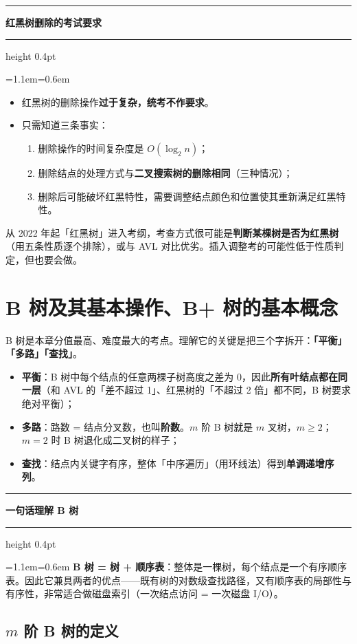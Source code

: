 \documentclass[11pt,openany,UTF8]{ctexbook}
\newcommand{\callouthead}[2]{%
  \par\addvspace{7pt}\noindent
  {\color{#1}\rule[-0.15em]{3pt}{1.05em}}\hspace{0.5em}%
  {\bfseries\color{#1}#2}\par\nobreak\vspace{-0.35em}%
  {\color{rulesep}\hrule height 0.4pt}\nobreak\vspace{0.45em}%
  \begingroup\small\setlength{\parindent}{0pt}%
  \leftskip=1.1em\rightskip=0.6em\noindent\ignorespaces}
\newcommand{\calloutend}{\par\endgroup\addvspace{7pt}}
\newenvironment{callkey}[1]{\callouthead{keybar}{#1}}{\calloutend}
\begin{document}
\begin{callkey}{红黑树删除的考试要求}
\begin{itemize}
\item 红黑树的删除操作\textbf{过于复杂，统考不作要求}。
\item 只需知道三条事实：
\begin{enumerate}
\item 删除操作的时间复杂度是 $O(\log_2 n)$；
\item 删除结点的处理方式与\textbf{二叉搜索树的删除相同}（三种情况）；
\item 删除后可能破坏红黑特性，需要调整结点颜色和位置使其重新满足红黑特性。
\end{enumerate}
\end{itemize}
从 2022 年起「红黑树」进入考纲，考查方式很可能是\textbf{判断某棵树是否为红黑树}（用五条性质逐个排除），或与 AVL 对比优劣。插入调整考的可能性低于性质判定，但也要会做。

\end{callkey}

\section{B 树及其基本操作、B+ 树的基本概念}

B 树是本章分值最高、难度最大的考点。理解它的关键是把三个字拆开：\textbf{「平衡」「多路」「查找」}。

\begin{itemize}
\item \textbf{平衡}：B 树中每个结点的任意两棵子树高度之差为 0，因此\textbf{所有叶结点都在同一层}（和 AVL 的「差不超过 1」、红黑树的「不超过 2 倍」都不同，B 树要求绝对平衡）；
\item \textbf{多路}：路数 = 结点分叉数，也叫\textbf{阶数}。$m$ 阶 B 树就是 $m$ 叉树，$m\ge 2$；$m=2$ 时 B 树退化成二叉树的样子；
\item \textbf{查找}：结点内关键字有序，整体「中序遍历」（用环线法）得到\textbf{单调递增序列}。
\end{itemize}
\begin{callkey}{一句话理解 B 树}
\textbf{B 树 = 树 + 顺序表}：整体是一棵树，每个结点是一个有序顺序表。因此它兼具两者的优点——既有树的对数级查找路径，又有顺序表的局部性与有序性，非常适合做磁盘索引（一次结点访问 = 一次磁盘 I/O）。

\end{callkey}

\subsection{$m$ 阶 B 树的定义}
\end{document}
